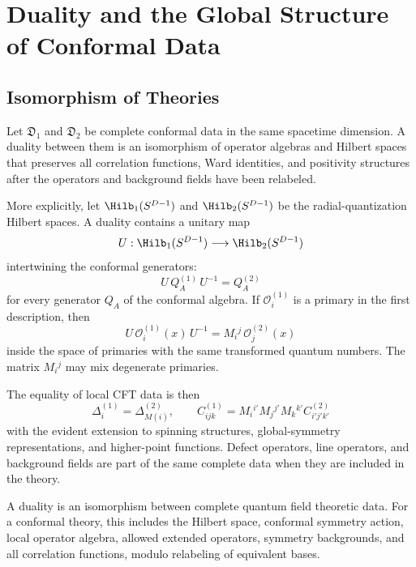 \chapter{Duality and the Global Structure of Conformal Data}
\label{ch:volume-iii-duality-global-structure-conformal-data}

\section{Isomorphism of Theories}

Let \(\mathfrak D_1\) and \(\mathfrak D_2\) be complete conformal data in the
same spacetime dimension.  A duality between them is an isomorphism of
operator algebras and Hilbert spaces that preserves all correlation functions,
Ward identities, and positivity structures after the operators and background
fields have been relabeled.

More explicitly, let \(\Hilb_1(S^{D-1})\) and \(\Hilb_2(S^{D-1})\) be the
radial-quantization Hilbert spaces.  A duality contains a unitary map
\[
  U:\Hilb_1(S^{D-1})\longrightarrow \Hilb_2(S^{D-1})
\]
intertwining the conformal generators:
\[
  U\,Q_A^{(1)}\,U^{-1}=Q_A^{(2)}
\]
for every generator \(Q_A\) of the conformal algebra.  If
\(\mathcal O_i^{(1)}\) is a primary in the first description, then
\[
  U\,\mathcal O_i^{(1)}(x)\,U^{-1}
  =
  M_i{}^j\,\mathcal O_j^{(2)}(x)
\]
inside the space of primaries with the same transformed quantum numbers.  The
matrix \(M_i{}^j\) may mix degenerate primaries.

The equality of local CFT data is then
\begin{equation}
  \Delta_i^{(1)}=\Delta_{M(i)}^{(2)},
  \qquad
  C_{ijk}^{(1)}
  =
  M_i{}^{i'}M_j{}^{j'}M_k{}^{k'}C_{i'j'k'}^{(2)}
  \label{eq:duality-cft-data-isomorphism}
\end{equation}
with the evident extension to spinning structures, global-symmetry
representations, and higher-point functions.  Defect operators, line
operators, and background fields are part of the same complete data when they
are included in the theory.

\begin{definition}[Duality]
  A duality is an isomorphism between complete quantum field theoretic data.
  For a conformal theory, this includes the Hilbert space, conformal symmetry
  action, local operator algebra, allowed extended operators, symmetry
  backgrounds, and all correlation functions, modulo relabeling of equivalent
  bases.
\end{definition}

